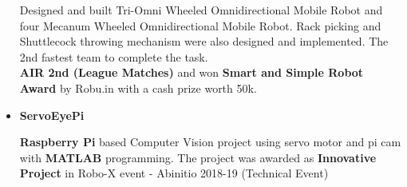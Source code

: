 \documentclass[a4paper, 10pt]{article}
\begin{document}
\begin{itemize}
Designed and built Tri-Omni Wheeled Omnidirectional Mobile Robot and four Mecanum Wheeled Omnidirectional Mobile Robot$.$ Rack picking and Shuttlecock throwing mechanism were also designed and implemented$.$ The 2nd fastest team to complete the task$.$ \\
\textbf{AIR 2nd (League Matches)} and won \textbf{Smart and Simple Robot Award} by Robu.in with a cash prize worth 50k.

\item {\textbf{\large{ServoEyePi}}}

\textbf{Raspberry Pi} based Computer Vision project using servo motor and pi cam with \textbf{MATLAB} programming$.$ The project was awarded as \textbf{Innovative Project} in Robo-X event - Abinitio 2018-19 (Technical Event)



\end{itemize}
\end{document}
